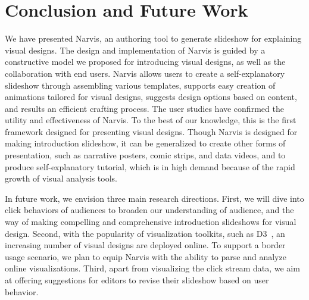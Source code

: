 \section{Conclusion and Future Work}
We have presented Narvis, an authoring tool to generate slideshow for explaining visual designs. 
The design and implementation of Narvis is guided by a constructive model we proposed for introducing visual designs, as well as the collaboration with end users. 
Narvis allows users to create a self-explanatory slideshow through assembling various templates, supports easy creation of animations tailored for visual designs, suggests design options based on content, and results an efficient crafting process.
The user studies have confirmed the utility and effectiveness of Narvis. To the best of our knowledge, this is the first framework designed for presenting visual designs. Though Narvis is designed for making introduction slideshow, it can be generalized to create other forms of presentation, such as narrative posters, comic strips, and data videos, and to produce self-explanatory tutorial, which is in high demand because of the rapid growth of visual analysis tools.

In future work, we envision three main research directions. 
First, we will dive into click behaviors of audiences to broaden our understanding of audience, and the way of making compelling and comprehensive introduction slideshows for visual design. 
Second, with the popularity of visualization toolkits, such as D3~\cite{bostock2011d3}, an increasing number of visual designs are deployed online. To support a border usage scenario, we plan to equip Narvis with the ability to parse and analyze online visualizations. 
Third, apart from visualizing the click stream data, we aim at offering suggestions for editors to revise their slideshow based on user behavior.  
